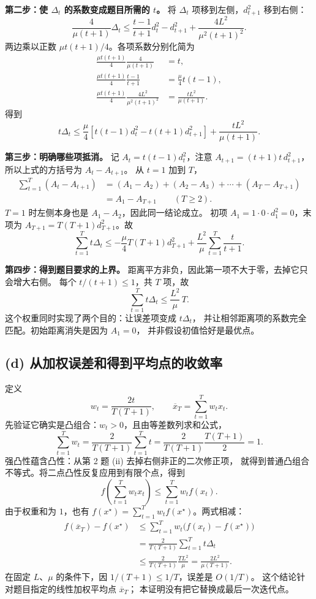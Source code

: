 \documentclass[UTF8,a4paper,11pt,fontset=fandol]{ctexart}
\begin{document}
\textbf{第二步：使 $\Delta_t$ 的系数变成题目所需的 $t$。}
将 $\Delta_t$ 项移到左侧，$d_{t+1}^2$ 移到右侧：
\[
 \frac4{\mu(t+1)}\Delta_t
 \leq\frac{t-1}{t+1}d_t^2-d_{t+1}^2
 +\frac{4L^2}{\mu^2(t+1)^2}.
\]
两边乘以正数 $\mu t(t+1)/4$。各项系数分别化简为
\begin{align*}
 \frac{\mu t(t+1)}4\frac4{\mu(t+1)}&=t,\\
 \frac{\mu t(t+1)}4\frac{t-1}{t+1}&=\frac\mu4t(t-1),\\
 \frac{\mu t(t+1)}4\frac{4L^2}{\mu^2(t+1)^2}&=\frac{tL^2}{\mu(t+1)}.
\end{align*}
得到
\[
 t\Delta_t\leq\frac\mu4
 \left[t(t-1)d_t^2-t(t+1)d_{t+1}^2\right]
 +\frac{tL^2}{\mu(t+1)}.
\]

\textbf{第三步：明确哪些项抵消。}
记 $A_t=t(t-1)d_t^2$，注意
$A_{t+1}=(t+1)t\,d_{t+1}^2$，所以上式的方括号为 $A_t-A_{t+1}$。
从 $t=1$ 加到 $T$，
\begin{align*}
 \sum_{t=1}^T(A_t-A_{t+1})
 &=(A_1-A_2)+(A_2-A_3)+\cdots+(A_T-A_{T+1})\\
 &=A_1-A_{T+1}\qquad(T\geq2).
\end{align*}
$T=1$ 时左侧本身也是 $A_1-A_2$，因此同一结论成立。
初项 $A_1=1\cdot0\cdot d_1^2=0$，末项为
$A_{T+1}=T(T+1)d_{T+1}^2$。故
\[
 \sum_{t=1}^Tt\Delta_t
 \leq-\frac\mu4T(T+1)d_{T+1}^2
 +\frac{L^2}{\mu}\sum_{t=1}^T\frac t{t+1}.
\]

\textbf{第四步：得到题目要求的上界。}
距离平方非负，因此第一项不大于零，去掉它只会增大右侧。
每个 $t/(t+1)\leq1$，共 $T$ 项，故
\[
 \boxed{\sum_{t=1}^Tt\Delta_t\leq\frac{L^2}{\mu}\,T.}
\]
这个权重同时实现了两个目的：让误差项变成 $t\Delta_t$，
并让相邻距离项的系数完全匹配。初始距离消失是因为 $A_1=0$，
并非假设初值恰好是最优点。

\subsection*{(d) 从加权误差和得到平均点的收敛率}
定义
\[
 w_t=\frac{2t}{T(T+1)},\qquad
 \overline x_T=\sum_{t=1}^Tw_tx_t.
\]
先验证它确实是凸组合：$w_t>0$，且由等差数列求和公式，
\[
 \sum_{t=1}^Tw_t
 =\frac2{T(T+1)}\sum_{t=1}^Tt
 =\frac2{T(T+1)}\frac{T(T+1)}2=1.
\]
强凸性蕴含凸性：从第 2 题 (ii) 去掉右侧非正的二次修正项，
就得到普通凸组合不等式。将二点凸性反复应用到有限个点，得到
\[
 f\left(\sum_{t=1}^Tw_tx_t\right)\leq\sum_{t=1}^Tw_tf(x_t).
\]
由于权重和为 $1$，也有
$f(x^\star)=\sum_{t=1}^Tw_tf(x^\star)$。两式相减：
\begin{align*}
 f(\overline x_T)-f(x^\star)
 &\leq\sum_{t=1}^Tw_t\big(f(x_t)-f(x^\star)\big)\\
 &=\frac2{T(T+1)}\sum_{t=1}^Tt\Delta_t\\
 &\leq\frac2{T(T+1)}\frac{TL^2}{\mu}
 =\boxed{\frac{2L^2}{\mu(T+1)}}.
\end{align*}
在固定 $L$、$\mu$ 的条件下，因 $1/(T+1)\leq1/T$，误差是 $O(1/T)$。
这个结论针对题目指定的线性加权平均点 $\overline x_T$；
本证明没有把它替换成最后一次迭代点。
\end{document}
